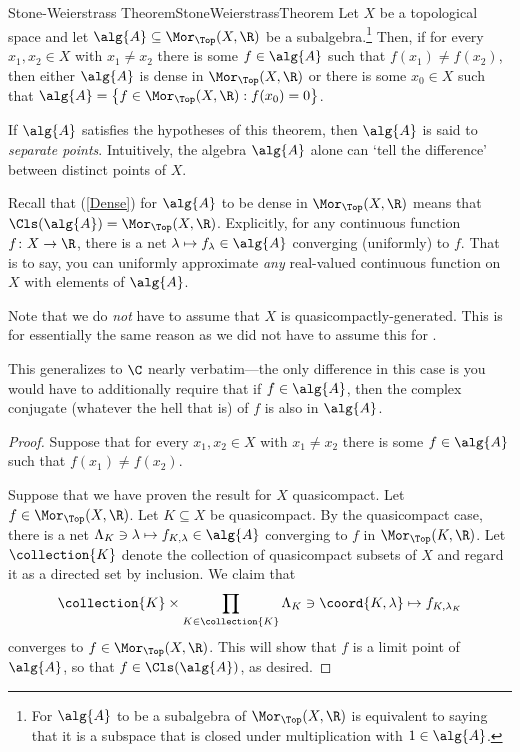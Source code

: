 \begin{thm}{Stone-Weierstrass Theorem}{StoneWeierstrassTheorem}
Let $X$ be a topological space and let $\alg{A}\subseteq \Mor _{\Top}(X,\R )$ be a subalgebra.\footnote{For $\alg{A}$ to be a subalgebra of $\Mor _{\Top}(X,\R )$ is equivalent to saying that it is a subspace that is closed under multiplication with $1\in \alg{A}$.}  Then, if for every $x_1,x_2\in X$ with $x_1\neq x_2$ there is some $f\in \alg{A}$ such that $f(x_1)\neq f(x_2)$, then either $\alg{A}$ is dense in $\Mor _{\Top}(X,\R )$ or there is some $x_0\in X$ such that $\alg{A}=\left\{ f\in \Mor _{\Top}(X,\R ):f(x_0)=0\right\}$.
\begin{rmk}
If $\alg{A}$ satisfies the hypotheses of this theorem, then $\alg{A}$ is said to \emph{separate points}.  Intuitively, the algebra $\alg{A}$ alone can `tell the difference' between distinct points of $X$.
\end{rmk}
\begin{rmk}
Recall that (\cref{Dense}) for $\alg{A}$ to be dense in $\Mor _{\Top}(X,\R )$ means that $\Cls (\alg{A})=\Mor _{\Top}(X,\R )$.  Explicitly, for any continuous function $f\colon X\rightarrow \R$, there is a net $\lambda \mapsto f_{\lambda}\in \alg{A}$ converging (uniformly) to $f$.  That is to say, you can uniformly approximate \emph{any} real-valued continuous function on $X$ with elements of $\alg{A}$.
\end{rmk}
\begin{rmk}
Note that we do \emph{not} have to assume that $X$ is quasicompactly-generated.  This is for essentially the same reason as we did not have to assume this for .
\end{rmk}
\begin{rmk}
This generalizes to $\C$ nearly verbatim---the only difference in this case is you would have to additionally require that if $f\in \alg{A}$, then the complex conjugate (whatever the hell that is) of $f$ is also in $\alg{A}$.
\end{rmk}
\begin{proof}
Suppose that for every $x_1,x_2\in X$ with $x_1\neq x_2$ there is some $f\in \alg{A}$ such that $f(x_1)\neq f(x_2)$.

Suppose that we have proven the result for $X$ quasicompact.  Let $f\in \Mor _{\Top}(X,\R )$.  Let $K\subseteq X$ be quasicompact.  By the quasicompact case, there is a net $\Lambda _K\ni \lambda \mapsto f_{K,\lambda}\in \alg{A}$ converging to $f$ in $\Mor _{\Top}(K,\R )$.  Let $\collection{K}$ denote the collection of quasicompact subsets of $X$ and regard it as a directed set by inclusion.  We claim that
\begin{equation}
\collection{K}\times \prod _{K\in \collection{K}}\Lambda _K\ni \coord{K,\lambda}\mapsto f_{K,\lambda _K}
\end{equation}
converges to $f\in \Mor _{\Top}(X,\R )$.  This will show that $f$ is a limit point of $\alg{A}$, so that $f\in \Cls (\alg{A})$, as desired.


\end{proof}
\end{thm}
